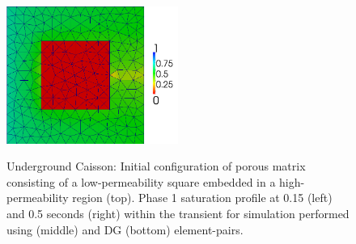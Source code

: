 \begin{figure}[h]
{{\hspace{-0.cm}\includegraphics[width=0.5\textwidth]{./diagrams/dg_square_05_low}}}
 \caption{Underground Caisson: Initial configuration of porous matrix consisting of a low-permeability square embedded in a high-permeability region (top). Phase 1 saturation profile at 0.15 (left) and 0.5 seconds (right) within the transient for simulation performed using  (middle) and DG (bottom) element-pairs.\label{fig:square_permeability}}
\end{figure}


